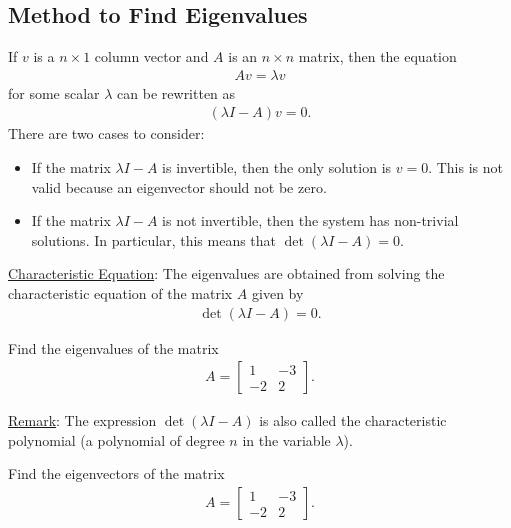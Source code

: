 \documentclass[12pt,a4paper]{article}
\newcounter{example}[section]
\begin{document}
	\newpage
	
	\subsection{Method to Find Eigenvalues}
	If $v$ is a $n \times 1$ column vector and $A$ is an $n \times n$ matrix, then the equation
		\begin{align*}
		Av = \lambda v
		\end{align*}
	for some scalar $\lambda$ can be rewritten as
		\begin{align*}
		(\lambda I - A) v = 0 .
		\end{align*}
	There are two cases to consider:
		\begin{itemize}
		\item If the matrix $\lambda I - A$ is invertible, then the only solution is $v = 0$. This is not valid because an eigenvector should not be zero.
		\item If the matrix $\lambda I - A$ is not invertible, then the system has non-trivial solutions. In particular, this means that $\det (\lambda I - A) = 0$.
		\end{itemize}
		
	\vspace*{16pt}
		
	\underline{Characteristic Equation}: The eigenvalues are obtained from solving the characteristic equation of the matrix $A$ given by
		\begin{align*}
		\det (\lambda I - A ) = 0 .
		\end{align*}
		
	\begin{example}
	Find the eigenvalues of the matrix
		\begin{align*}
		A = \begin{bmatrix}
		1 & -3 \\ -2 & 2
		\end{bmatrix} .
		\end{align*}
	\end{example}
	
	\vfill
	
	\underline{Remark}: The expression $\det (\lambda I - A)$ is also called the characteristic polynomial (a polynomial of degree $n$ in the variable $\lambda$).
	
	\newpage
	
	\begin{example}
	Find the eigenvectors of the matrix
		\begin{align*}
		A = \begin{bmatrix}
		1 & -3 \\ -2 & 2
		\end{bmatrix} .
		\end{align*}
	\end{example}
	
\end{document}

